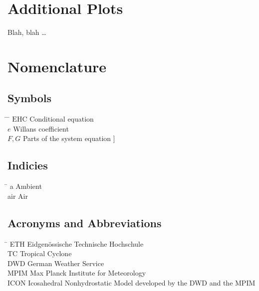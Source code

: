 



\chapter{Additional Plots}\label{sec:again_something}

Blah, blah \dots

 \cleardoublepage
 

\chapter*{Nomenclature}\label{chap:symbole}
 
 \section*{Symbols}
\begin{tabbing}
 \hspace*{1.6cm} \= \hspace*{8cm} \= \kill
 $\mathrm{EHC}$ \> Conditional equation \> [$-$] \\[0.5ex]
 $e$ \> Willans coefficient \> [$-$] \\[0.5ex]
 $F,G$ \> Parts of the system equation \> [\unitfrac[]{K}{s}]
\end{tabbing}

\section*{Indicies}
\begin{tabbing}
 \hspace*{1.6cm}  \= \kill
 a \> Ambient \\[0.5ex]
 air \> Air
\end{tabbing}

\section*{Acronyms and Abbreviations}
\begin{tabbing}
 \hspace*{1.6cm}  \= \kill
 ETH \> Eidgen\"{o}ssische Technische Hochschule \\[0.5ex]
 TC \> Tropical Cyclone \\[0.5ex]
 DWD \> German Weather Service\\[0.5ex]
 MPIM \> Max Planck Institute for Meteorology\\[0.5ex]
 ICON \> Icosahedral Nonhydrostatic Model developed by the DWD and the MPIM\\[0.5ex]
\end{tabbing}

